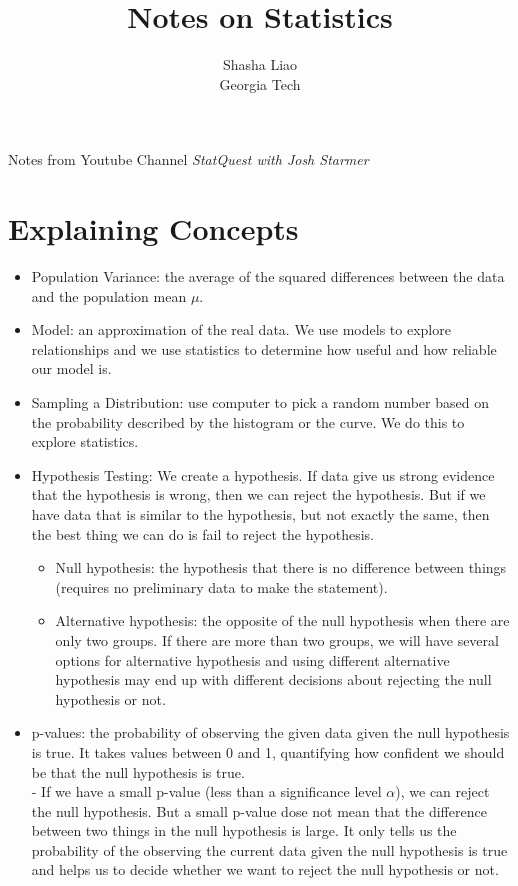 \documentclass[twoside,12pt]{article}
\begin{document}
\title{Notes on Statistics}
\author {Shasha Liao \\ Georgia Tech}
\maketitle
Notes from Youtube Channel \textit{StatQuest with Josh Starmer}
\section{Explaining Concepts}
\begin{itemize}
\item Population Variance: the average of the squared differences between the data and the population mean $\mu$.
\item Model: an approximation of the real data. We use models to explore relationships and we use statistics to determine how useful and how reliable our model is.
\item Sampling a Distribution: use computer to pick a random number based on the probability described by the histogram or the curve. We do this to explore statistics. 
\item Hypothesis Testing: We create a hypothesis. If data give us strong evidence that the hypothesis is wrong, then we can reject the hypothesis. But if we have data that is similar to the hypothesis, but not exactly the same, then the best thing we can do is fail to reject the hypothesis.
\begin{itemize}
\item Null hypothesis: the hypothesis that there is no difference between things (requires no preliminary data to make the statement).
\item Alternative hypothesis: the opposite of the null hypothesis when there are only two groups. If there are more than two groups, we will have several options for alternative hypothesis and using different alternative hypothesis may end up with different decisions about rejecting the null hypothesis or not. 
\end{itemize}
\item p-values: the probability of observing the given data given the null hypothesis is true. It takes values between 0 and 1, quantifying how confident we should be that the null hypothesis is true. \\
- If we have a small p-value (less than a significance level $\alpha$), we can reject the null hypothesis. But a small p-value dose not mean that the difference between two things in the null hypothesis is large. It only tells us the probability of the observing the current data given the null hypothesis is true and helps us to decide whether we want to reject the null hypothesis or not.

\end{itemize}
\end{document}
